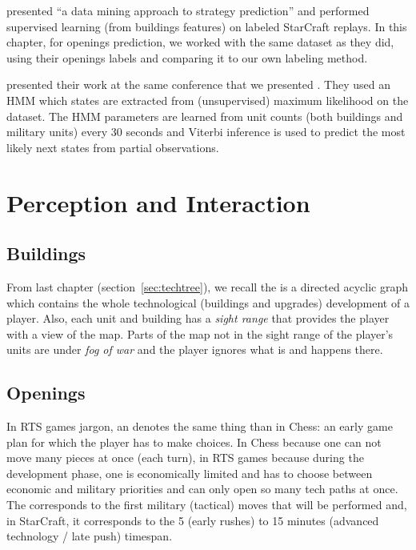 \cite{weberStrat} presented ``a data mining approach to strategy prediction'' and performed supervised learning (from buildings features) on labeled StarCraft replays. In this chapter, for openings prediction, we worked with the same dataset as they did, using their openings labels and comparing it to our own labeling method. %

\cite{HMMstrat_RTS_AIIDE11} presented their work at the same conference that we presented \citep{SYNNAEVE:StratPred}. They used an HMM which states are extracted from (unsupervised) maximum likelihood on the dataset. The HMM parameters are learned from unit counts (both buildings and military units) every 30 seconds and Viterbi inference is used to predict the most likely next states from partial observations. 


\section{Perception and Interaction}

\subsection{Buildings}
\label{sec:buildings}

From last chapter (section~\ref{sec:techtree}), we recall the \textit{} is a directed acyclic graph which contains the whole technological (buildings and upgrades) development of a player. Also, each unit and building has a \textit{sight range} that provides the player with a view of the map. Parts of the map not in the sight range of the player's units are under \textit{fog of war} and the player ignores what is and happens there. 


\subsection{Openings}
\label{sec:openings}

In RTS games jargon, an \textit{} denotes the same thing than in Chess: an early game plan for which the player has to make choices. In Chess because one can not move many pieces at once (each turn), in RTS games because during the development phase, one is economically limited and has to choose between economic and military priorities and can only open so many tech paths at once. The  corresponds to the first military (tactical) moves that will be performed and, in StarCraft, it corresponds to the 5 (early rushes) to 15 minutes (advanced technology / late push) timespan. 

